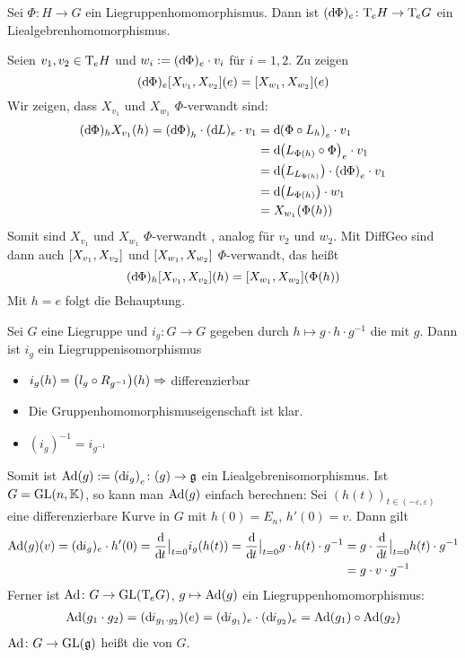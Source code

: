 \begin{lemma}[label=lem:122]
	Sei $\Phi \colon H \to G$ ein Liegruppenhomomorphismus.
	Dann ist $(\mathd\Phi)_e \colon \Tmap_e H \to \Tmap_e G$ ein Liealgebrenhomomorphismus.
\end{lemma}
\begin{beweis}
	Seien $v_1,v_2 \in \Tmap_e H$ und $w_i := (\mathd \Phi)_e \cdot v_i$ für $i=1,2$.
	Zu zeigen
	\[
		(\mathd \Phi)_e \benbrace*{X_{v_1}, X_{v_2}} (e) = \benbrace*{X_{w_1},X_{w_2}}(e)
	\]
	Wir zeigen, dass $X_{v_1}$ und $X_{w_1}$ $\Phi$-verwandt sind:
	\begin{align}
		(\mathd \Phi)_h X_{v_1}(h) = \enbrace*{\mathd \Phi}_h \cdot (\mathd L)_e \cdot v_1 &= \mathd \enbrace*{\Phi \circ L_h}_e \cdot v_1 \\
		&= \mathd \enbrace*{L_{\Phi(h)} \circ \Phi}_e \cdot v_1 \\
		&= \mathd \enbrace*{L_{L_{\Phi(h)}}} \cdot \enbrace*{\mathd \Phi}_e \cdot v_1 \\
		&= \mathd \enbrace*{L_{\Phi(h)}} \cdot w_1 \\
		&= X_{w_1}(\Phi(h))
	\end{align}
	Somit sind $X_{v_1}$ und $X_{w_1}$ $\Phi$-verwandt , analog für $v_2$ und $w_2$.
	Mit DiffGeo  sind dann auch $\benbrace*{X_{v_1}, X_{v_2}}$ und $\benbrace*{X_{w_1},X_{w_2}}$ $\Phi$-verwandt, das heißt
	\[
		(\mathd \Phi)_h \benbrace*{X_{v_1},X_{v_2}}(h) = \benbrace*{X_{w_1}, X_{w_2}} \enbrace*{\Phi(h)}
	\]
	Mit $h=e$ folgt die Behauptung.
\end{beweis}

Sei $G$ eine Liegruppe und $i_g \colon G \to G$ gegeben durch $h \mapsto g \cdot h \cdot g^{-1}$ die  mit $g$.
Dann ist $i_g$ ein Liegruppenisomorphismus
\begin{itemize}
	\item $i_g(h) = \enbrace*{l_g \circ R_{g^{-1}}}(h) \Rightarrow$ differenzierbar
	\item Die Gruppenhomomorphismuseigenschaft ist klar. 
	\item $(i_g)^{-1}= i_{g^{-1}}$
\end{itemize}
Somit ist $\Ad(g) := \enbrace*{\mathd i_g}_e \colon \mathfrak(g) \to \mathfrak{g}$ ein Liealgebrenisomorphismus.
Ist $G = \GL(n,\mathbb{K})$, so kann man $\Ad(g)$ einfach berechnen:
Sei $(h(t))_{t \in (-\varepsilon,\varepsilon)}$ eine differenzierbare Kurve in $G$ mit $h(0)= E_n$, $h'(0)=v$.
Dann gilt
\begin{align}
	\Ad(g)(v)= (\mathd i_g)_e \cdot h'(0) = \diffd{}{t}\big|_{t=0} i_g (h(t)) = \diffd{}{t}\big|_{t=0} g \cdot h(t) \cdot g^{-1}
	&= g \cdot \diffd{}{t}\big|_{t=0} h(t) \cdot g^{-1}\\
	&= g \cdot v \cdot g^{-1}
\end{align}
Ferner ist $\Ad \colon G \to \GL\enbrace*{\Tmap_e G}$, $g \mapsto \Ad(g)$ ein Liegruppenhomomorphismus:
\begin{align}
	\Ad(g_1 \cdot g_2) = (\mathd i_{g_1 \cdot g_2})(e) = (\mathd i_{g_1})_e \cdot (\mathd i_{g_2})_e = \Ad(g_1) \circ \Ad(g_2)
\end{align}
$\Ad \colon G \to \GL(\mathfrak{g})$ heißt die  von $G$.

